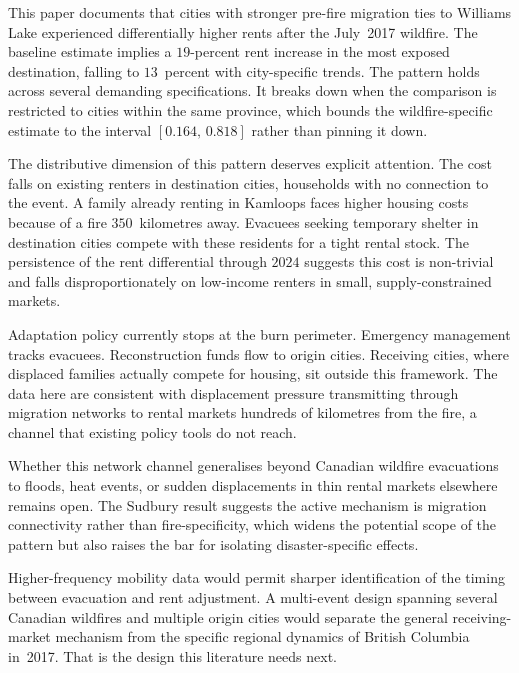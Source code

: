 \documentclass[12pt]{article}
\begin{document}

This paper documents that cities with stronger pre-fire migration ties to Williams
Lake experienced differentially higher rents after the July~2017 wildfire. The
baseline estimate implies a $19$-percent rent increase in the most exposed
destination, falling to $13$~percent with city-specific trends. The pattern
holds across several demanding specifications. It breaks down when the comparison
is restricted to cities within the same province, which bounds the
wildfire-specific estimate to the interval $[0.164,\,0.818]$ rather than
pinning it down.

The distributive dimension of this pattern deserves explicit attention. The cost falls on existing renters in destination cities, households with no
connection to the event. A family already renting in Kamloops faces higher housing
costs because of a fire $350$~kilometres away. Evacuees seeking temporary shelter in
destination cities compete with these residents for a tight rental stock. The
persistence of the rent differential through $2024$ suggests this cost is
non-trivial and falls disproportionately on low-income renters in small,
supply-constrained markets.

Adaptation policy currently stops at the burn perimeter. Emergency management
tracks evacuees. Reconstruction funds flow to origin cities. Receiving cities,
where displaced families actually compete for housing, sit outside this
framework. The data here are consistent with displacement pressure transmitting
through migration networks to rental markets hundreds of kilometres from the
fire, a channel that existing policy tools do not reach.

Whether this network channel generalises beyond Canadian wildfire evacuations to floods, heat events, or sudden displacements in thin rental markets elsewhere remains open. The Sudbury result suggests the active mechanism is migration connectivity rather than fire-specificity, which widens the potential scope of the pattern but also raises the bar for isolating disaster-specific effects.

Higher-frequency mobility data would permit sharper identification of the timing
between evacuation and rent adjustment. A multi-event design spanning several
Canadian wildfires and multiple origin cities would separate the general
receiving-market mechanism from the specific regional dynamics of British
Columbia in~2017. That is the design this literature needs next.
\end{document}
